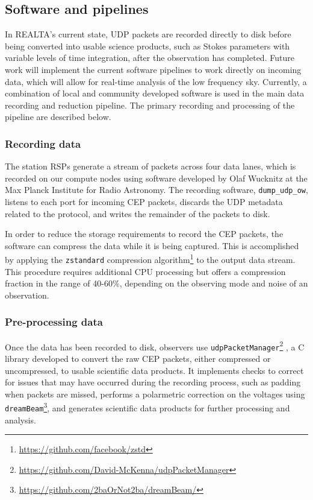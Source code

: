 \subsection{Software and pipelines}
\label{sec:softwareAndProcessing}
In REALTA's current state, UDP packets are recorded directly to disk before being converted into usable science products, such as Stokes parameters with variable levels of time integration, after the observation has completed. Future work will implement the current software pipelines to work directly on incoming data, which will allow for real-time analysis of the low frequency sky. Currently, a combination of local and community developed software is used in the main data recording and reduction pipeline. The primary recording and processing of the pipeline are described below.

\subsubsection{Recording data}
\label{sec:preproc}
The station RSPs generate a stream of packets across four data lanes, which is recorded on our compute nodes using software developed by Olaf Wucknitz at the Max Planck Institute for Radio Astronomy. The recording software, \texttt{dump\_udp\_ow}, listens to each port for incoming CEP packets, discards the UDP metadata related to the protocol, and writes the remainder of the packets to disk.

In order to reduce the storage requirements to record the CEP packets, the software can compress the data while it is being captured. This is accomplished by applying the \texttt{zstandard} compression algorithm\footnote{\hyperref[zstandard]{https://github.com/facebook/zstd}} to the output data stream. This procedure requires additional CPU processing but offers a compression fraction in the range of 40-60\%, depending on the observing mode and noise of an observation.

\subsubsection{Pre-processing data}
\label{sec:baseproc}%
Once the data has been recorded to disk, observers use \texttt{udpPacketManager}\footnote{\hyperref[udpPacketManager]{https://github.com/David-McKenna/udpPacketManager}} \citep{McKenna2020}, a C library developed to convert the raw CEP packets, either compressed or uncompressed, to usable scientific data products. It implements checks to correct for issues that may have occurred during the recording process, such as padding when packets are missed, performs a polarmetric correction on the voltages using \texttt{dreamBeam}\footnote{\hyperref[dreamBeam]{https://github.com/2baOrNot2ba/dreamBeam/}}, and generates scientific data products for further processing and analysis.

